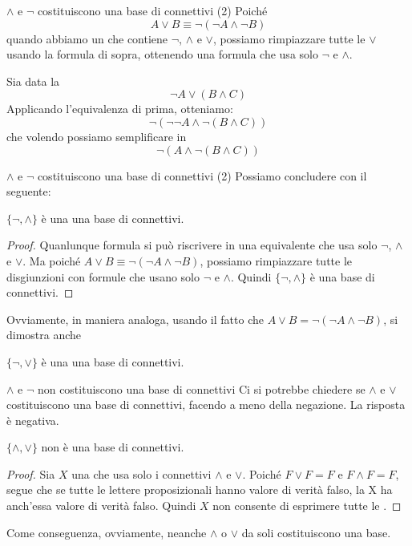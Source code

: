 \documentclass[aspectratio=169,10pt,dvipsnames,xcolor=table,handout]{beamer}
\begin{document}
\begin{frame}{$\wedge$ e $\neg$ costituiscono una base di connettivi (2)}
    Poiché
    \[A \vee B \equiv \neg(\neg A \wedge \neg B)\]
    quando abbiamo un \fp che contiene $\neg$, $\wedge$ e $\vee$, possiamo rimpiazzare tutte le $\vee$ usando la formula di sopra, ottenendo una formula che usa solo $\neg$ e $\wedge$.

    \begin{example}
        Sia data la \fp
        \[
            \neg A \vee (B \wedge C)
        \]
        Applicando l'equivalenza di prima, otteniamo:
        \[
            \neg (\neg \neg A \wedge \neg (B \wedge C))
        \]
        che volendo possiamo semplificare in
        \[
            \neg (A \wedge \neg (B \wedge C))
        \]
    \end{example}
\end{frame}

\begin{frame}{$\wedge$ e $\neg$ costituiscono una base di connettivi (2)}
    Possiamo concludere con il seguente:
    \begin{theorem}
        $\{ \neg, \wedge\}$ è una una base di connettivi.
    \end{theorem}
    \begin{proof}
        Quanlunque formula si può riscrivere in una equivalente che usa solo $\neg$, $\wedge$ e $\vee$. Ma poiché $A \vee B \equiv \neg(\neg A \wedge \neg B)$, possiamo rimpiazzare tutte le disgiunzioni con formule che usano solo $\neg$ e $\wedge$. Quindi $\{ \neg, \wedge\}$ è una base di connettivi.
    \end{proof}
    Ovviamente, in maniera analoga, usando il fatto che $A \vee B = \neg(\neg A \wedge \neg B)$, si dimostra anche
    \begin{theorem}
        $\{ \neg, \vee\}$ è una una base di connettivi.
    \end{theorem}
\end{frame}

\begin{frame}{$\wedge$ e $\neg$ non costituiscono una base di connettivi}
    Ci si potrebbe chiedere se $\wedge$ e $\vee$ costituiscono una base di connettivi, facendo a meno della negazione. La risposta è negativa.

    \begin{theorem}
        $\{ \wedge, \vee\}$ non è una base di connettivi.
    \end{theorem}
    \begin{proof}
        Sia $X$ una \fp che usa solo i connettivi $\wedge$ e $\vee$. Poiché $F \vee F = F$ e $F \wedge F= F$, segue che se tutte le lettere proposizionali hanno valore di verità falso, la \fp X ha anch'essa valore di verità falso. Quindi $X$ non consente di esprimere tutte le \fp.
    \end{proof}

    Come conseguenza, ovviamente, neanche $\wedge$  o $\vee$ da soli costituiscono una base.
\end{frame}
\end{document}
